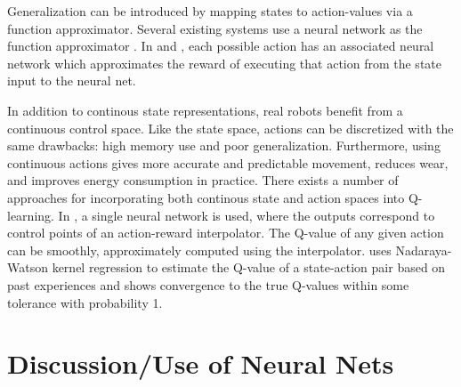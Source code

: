 \documentclass{article} %
\begin{document}
Generalization can be introduced by mapping states to action-values via a function approximator.  Several existing systems use a neural network as the function approximator \cite{lin} \cite{deep_rl} \cite{gaskett_thesis}. In \cite{lin} and \cite{deep_rl}, each possible action has an associated neural network which approximates the reward of executing that action from the state input to the neural net.  

In addition to continous state representations, real robots benefit from a continuous control space.  Like the state space, actions can be discretized with the same drawbacks: high memory use and poor generalization.  Furthermore, using continuous actions gives more accurate and predictable movement, reduces wear, and improves energy consumption in practice\cite{gaskett_thesis}.  There exists a number of approaches for incorporating both continous state and action spaces into Q-learning.  In \cite{gaskett_thesis}, a single neural network is used, where the outputs correspond to control points of an action-reward interpolator.  The Q-value of any given action can be smoothly, approximately computed using the interpolator. \cite{carden2014} uses Nadaraya-Watson kernel regression \cite{} to estimate the Q-value of a state-action pair based on past experiences and shows convergence to the true Q-values within some tolerance with probability 1.  

\section{Discussion/Use of Neural Nets}
\end{document}
